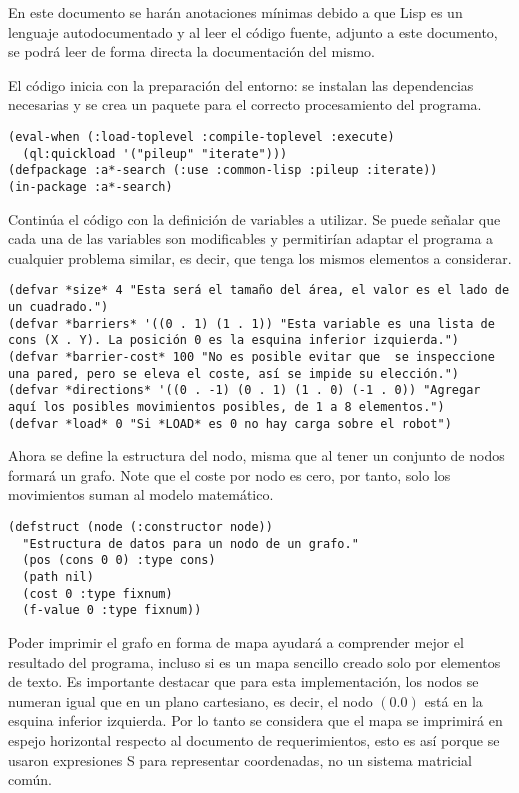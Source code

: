 \documentclass[a4paper,12pt]{article}
\begin{document}
En este documento se harán anotaciones mínimas debido a que Lisp es un lenguaje autodocumentado y al leer el código fuente, adjunto a este documento, se podrá leer de forma directa la documentación del mismo.

El código inicia con la preparación del entorno: se instalan las dependencias necesarias y se crea un paquete para el correcto procesamiento del programa.

\lstset{language=Lisp,label= ,caption= ,captionpos=b,numbers=none,numbers=left}
\begin{lstlisting}
(eval-when (:load-toplevel :compile-toplevel :execute)
  (ql:quickload '("pileup" "iterate")))
(defpackage :a*-search (:use :common-lisp :pileup :iterate))
(in-package :a*-search)
\end{lstlisting}

Continúa el código con la definición de variables a utilizar. Se puede señalar que cada una de las variables son modificables y permitirían adaptar el programa a cualquier problema similar, es decir, que tenga los mismos elementos a considerar.

\lstset{language=Lisp,label= ,caption= ,captionpos=b,numbers=none,numbers=left}
\begin{lstlisting}
(defvar *size* 4 "Esta será el tamaño del área, el valor es el lado de un cuadrado.")
(defvar *barriers* '((0 . 1) (1 . 1)) "Esta variable es una lista de cons (X . Y). La posición 0 es la esquina inferior izquierda.")
(defvar *barrier-cost* 100 "No es posible evitar que  se inspeccione una pared, pero se eleva el coste, así se impide su elección.")
(defvar *directions* '((0 . -1) (0 . 1) (1 . 0) (-1 . 0)) "Agregar aquí los posibles movimientos posibles, de 1 a 8 elementos.")
(defvar *load* 0 "Si *LOAD* es 0 no hay carga sobre el robot")
\end{lstlisting}

Ahora se define la estructura del nodo, misma que al tener un conjunto de nodos formará un grafo. Note que el coste por nodo es cero, por tanto, solo los movimientos suman al modelo matemático.

\lstset{language=Lisp,label= ,caption= ,captionpos=b,numbers=none,numbers=left}
\begin{lstlisting}
(defstruct (node (:constructor node))
  "Estructura de datos para un nodo de un grafo."
  (pos (cons 0 0) :type cons)
  (path nil)
  (cost 0 :type fixnum)
  (f-value 0 :type fixnum))
\end{lstlisting}

Poder imprimir el grafo en forma de mapa ayudará a comprender mejor el resultado del programa, incluso si es un mapa sencillo creado solo por elementos de texto. Es importante destacar que para esta implementación, los nodos se numeran igual que en un plano cartesiano, es decir, el nodo \((0 . 0)\) está en la esquina inferior izquierda. Por lo tanto se considera que el mapa se imprimirá en espejo horizontal respecto al documento de requerimientos, esto es así porque se usaron expresiones S para representar coordenadas, no un sistema matricial común.
\end{document}

